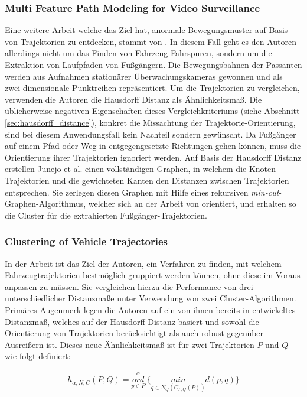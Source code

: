 \subsubsection*{Multi Feature Path Modeling for Video Surveillance}
Eine weitere Arbeit welche das Ziel hat, anormale Bewegungsmuster auf Basis von Trajektorien zu entdecken,
stammt von \cite[]{Junejo2004}. In diesem Fall geht es den Autoren allerdings nicht um das Finden von Fahrzeug-Fahrspuren,
sondern um die Extraktion von Laufpfaden von Fußgängern.
Die Bewegungsbahnen der Passanten werden aus Aufnahmen stationärer Überwachungskameras gewonnen und
als zwei-dimensionale Punktreihen repräsentiert.
Um die Trajektorien zu vergleichen, verwenden die Autoren die Hausdorff Distanz als Ähnlichkeitsmaß.
Die üblicherweise negativen Eigenschaften dieses
Vergleichkriteriums (siehe Abschnitt \ref{sec:hausdorff_distance}), konkret die Missachtung der
Trajektorie-Orientierung, sind bei diesem Anwendungsfall kein Nachteil sondern gewünscht.
Da Fußgänger auf einem Pfad oder Weg in entgegengesetzte Richtungen gehen können, muss die Orientierung
ihrer Trajektorien ignoriert werden.
Auf Basis der Hausdorff Distanz erstellen Junejo et al. einen vollständigen Graphen, in welchem die Knoten Trajektorien
und die gewichteten Kanten den Distanzen zwischen Trajektorien entsprechen.
Sie zerlegen diesen Graphen mit Hilfe eines rekursiven \textit{min-cut}-Graphen-Algorithmus, welcher sich
an der Arbeit von \cite[]{boykov2004experimental} orientiert, und erhalten so die Cluster für die
extrahierten Fußgänger-Trajektorien.

\subsubsection*{Clustering of Vehicle Trajectories}
In der Arbeit \cite[]{Atev2010} ist das Ziel der Autoren, ein Verfahren zu finden, mit welchem Fahrzeugtrajektorien
bestmöglich gruppiert werden können, ohne diese im Voraus anpassen zu müssen.
Sie vergleichen hierzu die Performance von drei unterschiedlicher Distanzmaße unter Verwendung von zwei Cluster-Algorithmen.
Primäres Augenmerk legen die Autoren auf ein von ihnen bereits in \cite[]{Atev2006} entwickeltes Distanzmaß,
welches auf der Hausdorff Distanz basiert und sowohl die Orientierung von Trajektorien berücksichtigt
als auch robust gegenüber Ausreißern ist. Dieses neue Ähnlichkeitsmaß ist für zwei Trajektorien $P$ und $Q$
wie folgt definiert:

\begin{ceqn}
\begin{align}
    h_{\alpha, N, C}(P, Q) = \overset{\alpha}{\underset{p \in P}{ord}}\ \Big\{ \underset{q \in N_Q(C_{P,Q}(P))}{min} d(p, q) \Big\}
\end{align}
\end{ceqn}

